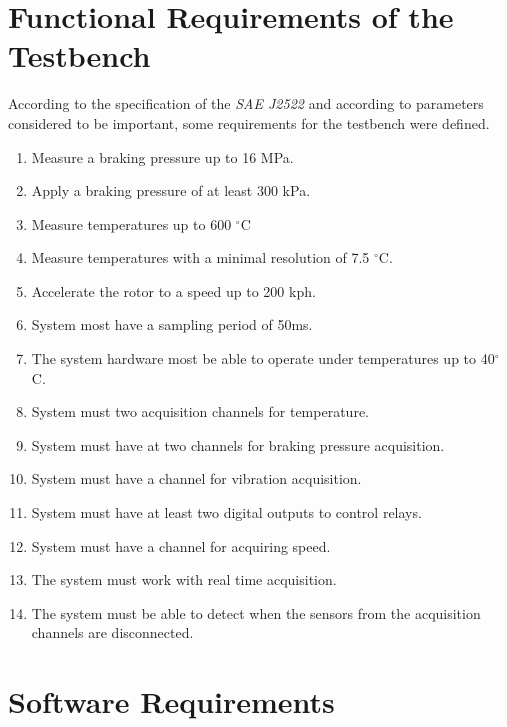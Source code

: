 \section{Functional Requirements of the Testbench}\label{sec:functionalRequirements}

	According to the specification of the \textit{SAE J2522} and according to parameters considered to be important, some requirements for the testbench were defined.

	\begin{enumerate}
		\item Measure a braking pressure up to 16 MPa.\label{itm:func-req-1}
		\item Apply a braking pressure of at least 300 kPa.\label{itm:func-req-2}
		\item Measure temperatures up to 600 $^{\circ}$C\label{itm:func-req-3}
		\item Measure temperatures with a minimal resolution of 7.5 $^{\circ}$C.\label{itm:func-req-4}
		\item Accelerate the rotor to a speed up to 200 kph.\label{itm:func-req-5}
		\item System most have a sampling period of 50ms.\label{itm:func-req-6}
		\item The system hardware most be able to operate under temperatures up to 40$^{\circ}$C.\label{itm:func-req-7}
		\item System must two acquisition channels for temperature.\label{itm:func-req-8}
		\item System must have at two channels for braking pressure acquisition.\label{itm:func-req-9}
		\item System must have a channel for vibration acquisition.\label{itm:func-req-10}
		\item System must have at least two digital outputs to control relays.\label{itm:func-req-11}
		\item System must have a channel for acquiring speed.\label{itm:func-req-12}
		\item The system must work with real time acquisition.\label{itm:func-req-13}
		\item The system must be able to detect when the sensors from the acquisition channels are disconnected.\label{itm:func-req-14}
	\end{enumerate}
	
\section{Software Requirements}\label{sec:software-requirements}
	
